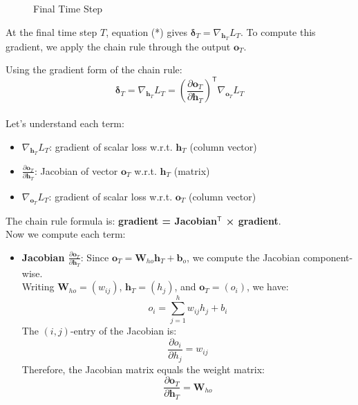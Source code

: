 \begin{notechapter}
\begin{figure}[h]
    \caption{Final Time Step}
    \label{chain-rule-to-bptt:fig:recursive_gradient}
\end{figure}

At the final time step $T$, equation (*) gives
$\bm{\delta}_T = \nabla_{\mathbf{h}_T} L_T$.
To compute this gradient, we apply the chain rule through the output
$\mathbf{o}_T$.

Using the gradient form of the chain rule:
\[
\bm{\delta}_T = \nabla_{\mathbf{h}_T} L_T = 
\left(\frac{\partial \mathbf{o}_T}{\partial \mathbf{h}_T}\right)^\mathsf{T}
\nabla_{\mathbf{o}_T} L_T
\]
\\
Let's understand each term:
\begin{itemize}[leftmargin=*,itemsep=2pt]
    \item $\nabla_{\mathbf{h}_T} L_T$: gradient of scalar loss w.r.t. $\mathbf{h}_T$
    (column vector)
    \item $\frac{\partial \mathbf{o}_T}{\partial \mathbf{h}_T}$: Jacobian of
    vector $\mathbf{o}_T$ w.r.t. $\mathbf{h}_T$ (matrix)
    \item $\nabla_{\mathbf{o}_T} L_T$: gradient of scalar loss w.r.t. $\mathbf{o}_T$
    (column vector)
\end{itemize}
\empty
The chain rule formula is: \textbf{gradient = Jacobian$^\mathsf{T}$ × gradient}.
\vspace{1em}
\\
Now we compute each term:

\begin{itemize}
    \item \textbf{Jacobian $\frac{\partial \mathbf{o}_T}{\partial \mathbf{h}_T}$}:
    Since $\mathbf{o}_T = \mathbf{W}_{ho} \mathbf{h}_T + \mathbf{b}_o$,
    we compute the Jacobian component-wise.
    \vspace{1em}
    \\
    Writing $\mathbf{W}_{ho} = (w_{ij})$, $\mathbf{h}_T = (h_j)$, and
    $\mathbf{o}_T = (o_i)$, we have:
    \[
    o_i = \sum_{j=1}^h w_{ij} h_j + b_i
    \]
    The $(i,j)$-entry of the Jacobian is:
    \[
    \frac{\partial o_i}{\partial h_j} = w_{ij}
    \]
    Therefore, the Jacobian matrix equals the weight matrix:
    \[
    \frac{\partial \mathbf{o}_T}{\partial \mathbf{h}_T} = \mathbf{W}_{ho}
    \]
    

\end{itemize}
\end{notechapter}
